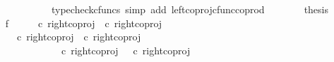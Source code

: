 \begin{isabellebody}
\ \isamarkupfalse%
\ {\isachardoublequoteopen}{\isachardot}{\kern0pt}{\isachardot}{\kern0pt}{\isachardot}{\kern0pt}\ {\isacharequal}{\kern0pt}\ {\isasymlangle}{\isasymt}{\isacharcomma}{\kern0pt}{\isasymf}{\isasymrangle}{\isachardoublequoteclose}\isanewline
\ \ \ \ \ \ \isamarkupfalse%
\ {\isacharparenleft}{\kern0pt}typecheck{\isacharunderscore}{\kern0pt}cfuncs{\isacharcomma}{\kern0pt}\ simp\ add{\isacharcolon}{\kern0pt}\ left{\isacharunderscore}{\kern0pt}coproj{\isacharunderscore}{\kern0pt}cfunc{\isacharunderscore}{\kern0pt}coprod{\isacharparenright}{\kern0pt}\isanewline
\ \ \ \ \isamarkupfalse%
\ \isamarkupfalse%
\ {\isacharquery}{\kern0pt}thesis\isacommand{{\isachardot}{\kern0pt}}\isamarkupfalse%
\isanewline
\ \ \isamarkupfalse%
\isanewline
\ \ \isamarkupfalse%
\ f{}{\isacharcolon}{\kern0pt}\ {\isachardoublequoteopen}{\isasymlangle}{\isasymt}{\isacharcomma}{\kern0pt}{\isasymt}{\isasymrangle}\ {\isasymamalg}\ {\isasymlangle}{\isasymt}{\isacharcomma}{\kern0pt}{\isasymf}{\isasymrangle}\ {\isasymamalg}\ {\isasymlangle}{\isasymf}{\isacharcomma}{\kern0pt}{\isasymt}{\isasymrangle}\ {\isasymcirc}\isactrlsub c\ {\isacharparenleft}{\kern0pt}right{\isacharunderscore}{\kern0pt}coproj\ {\isasymone}\ {\isacharparenleft}{\kern0pt}{\isasymone}{\isasymCoprod}{\isasymone}{\isacharparenright}{\kern0pt}{\isasymcirc}\isactrlsub c\ right{\isacharunderscore}{\kern0pt}coproj\ {\isasymone}\ {\isasymone}{\isacharparenright}{\kern0pt}\ {\isacharequal}{\kern0pt}\ {\isasymlangle}{\isasymf}{\isacharcomma}{\kern0pt}{\isasymt}{\isasymrangle}{\isachardoublequoteclose}\isanewline
\ \ \isamarkupfalse%
{\isacharminus}{\kern0pt}\ \isanewline
\ \ \ \ \isamarkupfalse%
\ {\isachardoublequoteopen}{\isasymlangle}{\isasymt}{\isacharcomma}{\kern0pt}{\isasymt}{\isasymrangle}\ {\isasymamalg}\ {\isasymlangle}{\isasymt}{\isacharcomma}{\kern0pt}{\isasymf}{\isasymrangle}\ {\isasymamalg}\ {\isasymlangle}{\isasymf}{\isacharcomma}{\kern0pt}{\isasymt}{\isasymrangle}\ {\isasymcirc}\isactrlsub c\ {\isacharparenleft}{\kern0pt}right{\isacharunderscore}{\kern0pt}coproj\ {\isasymone}\ {\isacharparenleft}{\kern0pt}{\isasymone}{\isasymCoprod}{\isasymone}{\isacharparenright}{\kern0pt}{\isasymcirc}\isactrlsub c\ right{\isacharunderscore}{\kern0pt}coproj\ {\isasymone}\ {\isasymone}{\isacharparenright}{\kern0pt}\ {\isacharequal}{\kern0pt}\ \isanewline
\ \ \ \ \ \ \ \ \ \ {\isacharparenleft}{\kern0pt}{\isasymlangle}{\isasymt}{\isacharcomma}{\kern0pt}{\isasymt}{\isasymrangle}\ {\isasymamalg}\ {\isasymlangle}{\isasymt}{\isacharcomma}{\kern0pt}{\isasymf}{\isasymrangle}\ {\isasymamalg}\ {\isasymlangle}{\isasymf}{\isacharcomma}{\kern0pt}{\isasymt}{\isasymrangle}\ {\isasymcirc}\isactrlsub c\ right{\isacharunderscore}{\kern0pt}coproj\ {\isasymone}\ {\isacharparenleft}{\kern0pt}{\isasymone}{\isasymCoprod}{\isasymone}{\isacharparenright}{\kern0pt}\ {\isacharparenright}{\kern0pt}{\isasymcirc}\isactrlsub c\ right{\isacharunderscore}{\kern0pt}coproj\ {\isasymone}\ {\isasymone}{\isachardoublequoteclose}\isanewline

\end{isabellebody}
